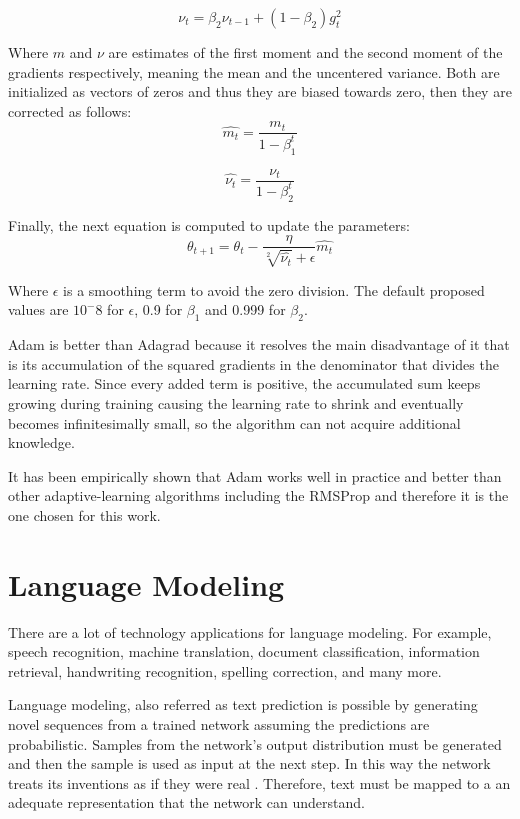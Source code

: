 \begin{equation}
\nu_t=\beta_2 \nu_{t-1} + (1-\beta_2)g^2_t
\end{equation}

Where $m$ and $\nu$ are estimates of the first moment and the second moment of the gradients respectively, meaning the mean and the uncentered variance. Both are initialized as vectors of zeros and thus they are biased towards zero, then they are corrected as follows:
\begin{equation}
\hat{m_t}=\frac{m_t}{1-\beta^t_1}
\end{equation}

\begin{equation}
\hat{\nu_t}=\frac{\nu_t}{1-\beta^t_2}
\end{equation}

Finally, the next equation is computed to update the parameters:
\begin{equation}
\theta_{t+1}=\theta_t-\frac{\eta}{\sqrt[2]{\hat{\nu_t}} + \epsilon} \hat{m_t} 
\end{equation}

Where $\epsilon$ is a smoothing term to avoid the zero division. The default proposed values are $10^-8$ for $\epsilon$, 0.9 for $\beta_1$ and 0.999 for $\beta_2$.

Adam is better than Adagrad because it resolves the main disadvantage of it that is its accumulation of the squared gradients in the denominator that divides the learning rate\cite{duchi2011adaptive}. Since every added term is positive, the accumulated sum keeps growing during training causing the learning rate to shrink and eventually becomes infinitesimally small, so the algorithm can not acquire additional knowledge\cite{ruder2016overview}. 

It has been empirically shown that Adam works well in practice and better than other adaptive-learning algorithms including the RMSProp and therefore it is the one chosen for this work.

\section{Language Modeling}
There are a lot of technology applications for language modeling. For example, speech recognition, machine translation, document classification, information retrieval, handwriting recognition, spelling correction, and many more.

Language modeling, also referred as text prediction is possible by generating novel sequences from a trained network assuming the predictions are probabilistic. Samples from the network's output distribution must be generated and then the sample is used as input at the next step. In this way the network treats its inventions as if they were real \cite{graves2013generating}. Therefore, text must be mapped to a an adequate representation that the network can understand.

